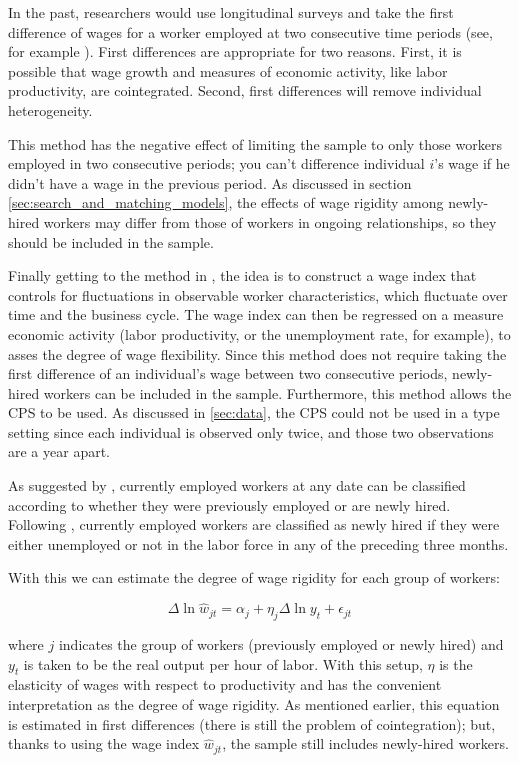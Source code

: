 \documentclass[11pt]{article}
\begin{document}
In the past, researchers would use longitudinal surveys and take the first difference of wages for a worker employed at two consecutive time periods (see, for example \cite{bils_1985}).
First differences are appropriate for two reasons.
First, it is possible that wage growth and measures of economic activity, like labor productivity, are cointegrated.
Second, first differences will remove individual heterogeneity.

This method has the negative effect of limiting the sample to only those workers employed in two consecutive periods;
you can't difference individual $i$'s wage if he didn't have a wage in the previous period.
As discussed in section \autoref{sec:search_and_matching_models}, the effects of wage rigidity among newly-hired workers may differ from those of workers in ongoing relationships, so they should be included in the sample.

Finally getting to the method in \cite{haefke_sonntag_vanRens_2013}, the idea is to construct a wage index that controls for fluctuations in observable worker characteristics, which fluctuate over time and the business cycle.
The wage index can then be regressed on a measure economic activity (labor productivity, or the unemployment rate, for example), to asses the degree of wage flexibility.
Since this method does not require taking the first difference of an individual's wage between two consecutive periods, newly-hired workers can be included in the sample.
Furthermore, this method allows the CPS to be used.
As discussed in \autoref{sec:data}, the CPS could not be used in a \cite{bils_1985} type setting since each individual is observed only twice, and those two observations are a year apart.

As suggested by \cite{pissarides_2009}, currently employed workers at any date can be classified according to whether they were previously employed or are newly hired.
Following \cite{haefke_sonntag_vanRens_2013}, currently employed workers are classified as newly hired if they were either unemployed or not in the labor force in any of the preceding three months.

With this we can estimate the degree of wage rigidity for each group of workers:

\begin{equation}
    \label{eq:second_stage}
    \Delta \ln \hat{w}_{jt} = \alpha_j + \eta_j \Delta \ln y_t + \epsilon_{jt}
\end{equation}

where $j$ indicates the group of workers (previously employed or newly hired) and $y_t$ is taken to be the real output per hour of labor.
With this setup, $\eta$ is the elasticity of wages with respect to productivity and has the convenient interpretation as the degree of wage rigidity.
As mentioned earlier, this equation is estimated in first differences (there is still the problem of cointegration);
but, thanks to using the wage index $\hat{w}_{jt}$, the sample still includes newly-hired workers.
\end{document}
